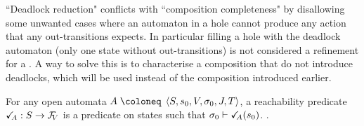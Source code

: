 \documentclass{article}
\begin{document}


``Deadlock reduction" conflicts with ``composition completeness" by disallowing some unwanted cases where an automaton in a hole cannot produce any action that any out-transitions expects.
In particular filling a hole with the deadlock automaton (only one state without out-transitions) is not considered a refinement for a .
A way to solve this  is to characterise a composition that do not introduce deadlocks, which will be used instead of the composition introduced earlier.
\begin{defi}[Reachability]
For any open automata \(A \defobject \OA{S}{s_0}{V}{\sigma_0}{J}{T}\), a reachability predicate \(\reach{A}: S \to \rformulae[V]\) is a predicate on states such that
 \(\sigma_0 \vdash \reach{A}\mpar{s_0}\).
 {}.
\end{defi}
\end{document}
